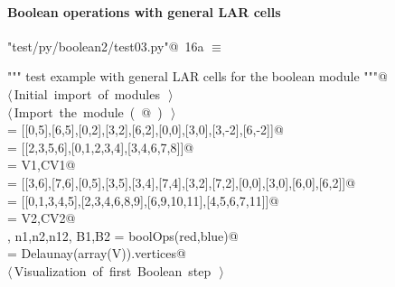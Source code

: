 \documentclass[11pt,oneside]{article}	%
\begin{document}
\paragraph{Boolean operations with general LAR cells}

\begin{flushleft} \small
\begin{minipage}{\linewidth} \label{scrap32}
\protect{}\verb@"test/py/boolean2/test03.py"@\nobreak\ {\footnotesize 16a }$\equiv$
\vspace{-1ex}
\begin{list}{}{} \item
\mbox{}\verb@""" test example with general LAR cells for the boolean module """@\\
\mbox{}\verb@@\hbox{$\langle\,$Initial import of modules\nobreak\ {\footnotesize {}}$\,\rangle$}\verb@@\\
\mbox{}\verb@@\hbox{$\langle\,$Import the module\nobreak\ ({\footnotesize {}\label{scrap33}
 }\mbox{}@ ) {\footnotesize {}}$\,\rangle$}\verb@@\\
\mbox{} = [[0,5],[6,5],[0,2],[3,2],[6,2],[0,0],[3,0],[3,-2],[6,-2]]@\\
\mbox{} = [[2,3,5,6],[0,1,2,3,4],[3,4,6,7,8]]@\\
\mbox{}\verb@blue = V1,CV1@\\
\mbox{} = [[3,6],[7,6],[0,5],[3,5],[3,4],[7,4],[3,2],[7,2],[0,0],[3,0],[6,0],[6,2]]@\\
\mbox{} = [[0,1,3,4,5],[2,3,4,6,8,9],[6,9,10,11],[4,5,6,7,11]]@\\
\mbox{}\verb@red = V2,CV2@\\
\mbox{}\verb@V, n1,n2,n12, B1,B2 = boolOps(red,blue)@\\
\mbox{}\verb@CV = Delaunay(array(V)).vertices@\\
\mbox{}\verb@@\hbox{$\langle\,$Visualization of first Boolean step\nobreak\ {\footnotesize {}}$\,\rangle$}\verb@@\\
\mbox{}\verb@@{\NWsep}
\end{list}
\vspace{-2ex}
\end{minipage}\\[4ex]
\end{flushleft}
\end{document}
